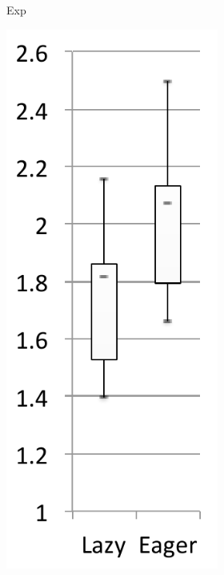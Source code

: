 \documentclass[sigplan,10pt,screen]{acmart}\settopmatter{printfolios=true,printccs=true,printacmref=true}
\begin{document}
\begin{figure}[bth]
\begin{subfigure}[b]{.48\textwidth}
\begin{subfigure}[b]{.24\textwidth}
    		\caption{Exp}
       	\end{subfigure}	
    	\begin{subfigure}[b]{.24\textwidth}
    		\includegraphics[width=\linewidth]{figures/wildflyExpCache} 

\end{subfigure}
\end{subfigure}
\end{figure}
\end{document}
